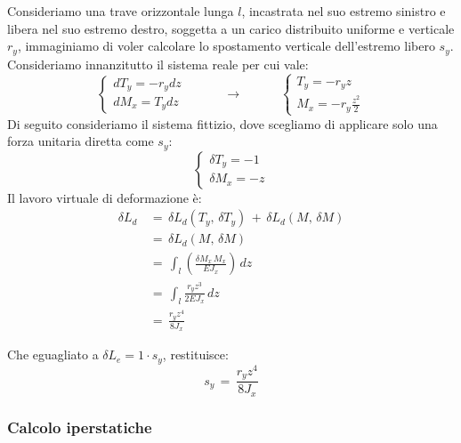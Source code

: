 \begin{esempioBox}
Consideriamo una trave orizzontale lunga $l$, incastrata nel suo estremo sinistro e libera nel suo estremo destro, soggetta a un carico distribuito uniforme e verticale  $r_y$, immaginiamo di voler calcolare lo spostamento verticale dell'estremo libero $s_y$.
Consideriamo innanzitutto il sistema reale per cui vale:
\begin{equation*}
    \begin{cases}
        dT_y = -r_y dz\\
        dM_x = T_ydz
    \end{cases}
    \quad\quad\quad \rightarrow\quad\quad\quad 
    \begin{cases}
        T_y = -r_y z\\
        M_x = -r_y \frac{z^2}{2}
    \end{cases}
\end{equation*}
Di seguito consideriamo il sistema fittizio, dove scegliamo di applicare solo una forza unitaria diretta come $s_y$:
\begin{equation*}
    \begin{cases}
        \delta T_y = -1\\
        \delta M_x = -z
    \end{cases}
\end{equation*}
Il lavoro virtuale di deformazione è:
\begin{align*}
    \delta L_d \,&=\, \delta L_d(T_y, \, \delta T_y)\,+\,\delta L_d(M, \, \delta M)\\
    &= \,\delta L_d(M, \, \delta M)\\
    &=\, \int_l 
    \left(
         \frac{\delta M_x \, M_x}{E J_x} 
    \right) \, dz \\
    &=\, \int_l    \frac{r_y z^3}{2E J_x}  \, dz \\
    &=\, \frac{r_y z^4}{8 J_x}
\end{align*}

Che eguagliato a $\delta L_e = 1\cdot s_y$, restituisce:
\begin{equation*}
    s_y\,=\, \frac{r_y z^4}{8 J_x}
\end{equation*}
\end{esempioBox}




\subsubsection*{Calcolo iperstatiche}

